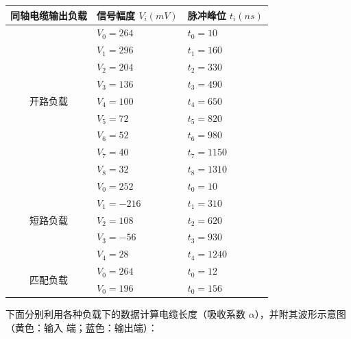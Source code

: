 \documentclass[UTF8]{ctexart}
\begin{document}
\begin{table}[H]
  \begin{center}
    \begin{tabular}{|c|l|l|}
      \hline
      \multicolumn{1}{|l|}{同轴电缆输出负载}  & 信号幅度 $V_i (mV) $  & 脉冲峰位 $t_i (ns) $   \\ \hline
      \multirow{9}{*}{开路负载}  &     $V_0 =264$       &  $t_0 =10$                 \\
                   &     $V_1 =296$               &  $t_1 =160$               \\
                   &     $V_2 =204$               &  $t_2 =330$                \\
                   &     $V_3 =136$               &  $t_3 =490$                \\
                   &     $V_4 =100$               &  $t_4 =650$                \\
                   &     $V_5 =72$               &   $t_5 =820$                 \\
                   &     $V_6 =52$               &   $t_6 =980$                 \\
                   &     $V_7 =40$               &   $t_7 =1150$                \\ 
                   & $V_8 =32$                   & $t_8 =1310$                   \\\hline
      \multirow{5}{*}{短路负载} & $V_0 =252$ & $t_0 =10$  \\
                       &    $V_1 =-216$     &   $t_1 =310$                \\
                       &    $V_2 =108$     &   $t_2 =620$                \\
                       &    $V_3 =-56$     &   $t_3 =930$                \\
                       &    $V_4 =28$     &   $t_4 =1240$                \\ \hline
      \multirow{2}{*}{匹配负载} & $V_0 =264$  & $t_0 =12$ \\
                       &     $V_0 =196$               &      $t_0 =156$     \\ \hline
      \end{tabular}
  \end{center}
\end{table}

下面分别利用各种负载下的数据计算电缆长度（吸收系数 $\alpha$），并附其波形示意图（黄色：输入
端；蓝色：输出端）：
\end{document}
